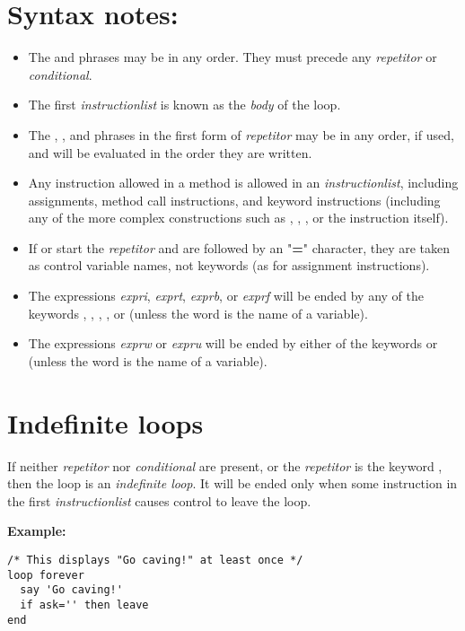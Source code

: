 \section{Syntax notes:}
\begin{itemize}
\item 
The  and  phrases may be in any order.
They must precede any \emph{repetitor} or \emph{conditional}.
\item 
{}
The first \emph{instructionlist} is known as the \emph{body} of
the loop.
\item 
The , , and  phrases in the first form
of \emph{repetitor} may be in any order, if used, and will be
evaluated in the order they are written.
\item 
Any instruction allowed in a method is allowed in an
\emph{instructionlist}, including assignments, method call
instructions, and keyword instructions (including any of the more
complex constructions such as , , ,
or the  instruction itself).
\item 
If  or  start the \emph{repetitor} and
are followed by an "\textbf{=}" character, they are taken as
control variable names, not keywords (as for assignment instructions).
\item 
The expressions \emph{expri}, \emph{exprt}, \emph{exprb}, or
\emph{exprf} will be ended by any of the keywords ,
, , , or  (unless
the word is the name of a variable).
\item 
The expressions \emph{exprw} or \emph{expru} will be ended by
either of the keywords  or  (unless the
word is the name of a variable).
\end{itemize}
\section{Indefinite loops}
 If neither \emph{repetitor} nor \emph{conditional} are
present, or the \emph{repetitor} is the keyword ,
then the loop is an \emph{indefinite loop}.
It will be ended only when some instruction in the first
\emph{instructionlist} causes control to leave the loop.

\textbf{Example:}
\begin{lstlisting}
/* This displays "Go caving!" at least once */
loop forever
  say 'Go caving!'
  if ask='' then leave
end
\end{lstlisting}
